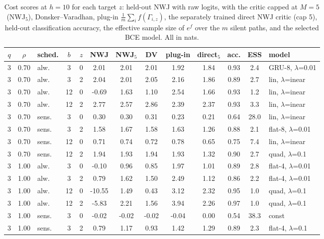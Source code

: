 \documentclass[10pt]{article}
\begin{document}
\begin{table}[htbp]
\centering
\scriptsize
\caption{Cost scores at $h=10$ for each target $z$: held-out NWJ with raw logits, with the critic capped at $M=5$ (NWJ$_5$), Donsker--Varadhan, plug-in $\frac1m\sum_i f(\Gamma_{i,z})$, the separately trained direct NWJ critic (cap 5), held-out classification accuracy, the effective sample size of $e^{f}$ over the $m$ silent paths, and the selected BCE model. All in nats.}\label{tab:cost}
\begin{adjustbox}{max width=\textwidth}
\begin{tabular}{cclcc cccc c cc l}
\toprule
$q$ & $\rho$ & sched. & $b$ & $z$ & NWJ & NWJ$_5$ & DV & plug-in & direct$_5$ & acc. & ESS & model \\
\midrule
3 & 0.70 & alw. & 3 & 0 & 2.01 & 2.01 & 2.01 & 1.92 & 1.84 & 0.93 & 2.4 & GRU-8, $\lambda$=0.01 \\
3 & 0.70 & alw. & 3 & 2 & 2.04 & 2.01 & 2.05 & 2.16 & 1.86 & 0.89 & 2.7 & lin, $\lambda$=inear \\
3 & 0.70 & alw. & 12 & 0 & -0.69 & 1.63 & 1.10 & 2.54 & 1.66 & 0.93 & 1.2 & lin, $\lambda$=inear \\
3 & 0.70 & alw. & 12 & 2 & 2.77 & 2.57 & 2.86 & 2.39 & 2.37 & 0.93 & 3.3 & lin, $\lambda$=inear \\
3 & 0.70 & sens. & 3 & 0 & 0.30 & 0.30 & 0.31 & 0.23 & 0.21 & 0.64 & 28.0 & lin, $\lambda$=inear \\
3 & 0.70 & sens. & 3 & 2 & 1.58 & 1.67 & 1.58 & 1.63 & 1.26 & 0.88 & 2.1 & flat-8, $\lambda$=0.01 \\
3 & 0.70 & sens. & 12 & 0 & 0.71 & 0.74 & 0.72 & 0.78 & 0.65 & 0.75 & 7.4 & lin, $\lambda$=inear \\
3 & 0.70 & sens. & 12 & 2 & 1.94 & 1.93 & 1.94 & 1.93 & 1.32 & 0.90 & 2.7 & quad, $\lambda$=0.1 \\
3 & 1.00 & alw. & 3 & 0 & -0.10 & 0.96 & 0.85 & 1.97 & 1.01 & 0.89 & 2.8 & flat-4, $\lambda$=0.01 \\
3 & 1.00 & alw. & 3 & 2 & 0.79 & 1.62 & 1.50 & 2.49 & 1.12 & 0.86 & 2.2 & flat-4, $\lambda$=0.01 \\
3 & 1.00 & alw. & 12 & 0 & -10.55 & 1.49 & 0.43 & 3.12 & 2.32 & 0.95 & 1.0 & quad, $\lambda$=0.1 \\
3 & 1.00 & alw. & 12 & 2 & -5.83 & 2.21 & 1.56 & 3.94 & 2.26 & 0.97 & 1.0 & quad, $\lambda$=0.1 \\
3 & 1.00 & sens. & 3 & 0 & -0.02 & -0.02 & -0.02 & -0.04 & 0.00 & 0.54 & 38.3 & const \\
3 & 1.00 & sens. & 3 & 2 & 0.79 & 1.17 & 0.93 & 1.42 & 1.29 & 0.89 & 2.3 & flat-4, $\lambda$=0.1 \\

\end{tabular}
\end{adjustbox}
\end{table}
\end{document}
